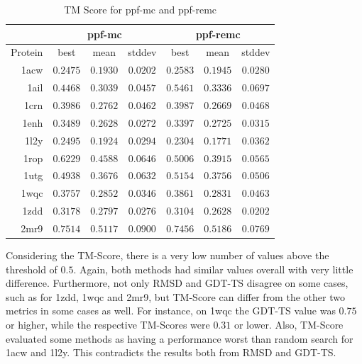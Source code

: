 \begin{table}
  \centering
  \begin{tabular}{r|c|c|c||c|c|c}
            & \multicolumn{3}{c}{ppf-mc} & \multicolumn{3}{||c}{ppf-remc} \\ \hline
    Protein & best          & mean          & stddev   & best          & mean          & stddev   \\ \hline \hline
    1acw    & $0.2475$      & $0.1930$      & $0.0202$ & $0.2583$      & $0.1945$      & $0.0280$ \\ \hline
    1ail    & $0.4468$      & $0.3039$      & $0.0457$ & $\bm{0.5461}$ & $0.3336$      & $0.0697$ \\ \hline
    1crn    & $0.3986$      & $0.2762$      & $0.0462$ & $0.3987$      & $0.2669$      & $0.0468$ \\ \hline
    1enh    & $0.3489$      & $0.2628$      & $0.0272$ & $0.3397$      & $0.2725$      & $0.0315$ \\ \hline
    1l2y    & $0.2495$      & $0.1924$      & $0.0294$ & $0.2304$      & $0.1771$      & $0.0362$ \\ \hline
    1rop    & $\bm{0.6229}$ & $0.4588$      & $0.0646$ & $\bm{0.5006}$ & $0.3915$      & $0.0565$ \\ \hline
    1utg    & $0.4938$      & $0.3676$      & $0.0632$ & $\bm{0.5154}$ & $0.3756$      & $0.0506$ \\ \hline
    1wqc    & $0.3757$      & $0.2852$      & $0.0346$ & $0.3861$      & $0.2831$      & $0.0463$ \\ \hline
    1zdd    & $0.3178$      & $0.2797$      & $0.0276$ & $0.3104$      & $0.2628$      & $0.0202$ \\ \hline
    2mr9    & $\bm{0.7514}$ & $\bm{0.5117}$ & $0.0900$ & $\bm{0.7456}$ & $\bm{0.5186}$ & $0.0769$ \\ \hline
  \end{tabular}
  \caption{TM Score for ppf-mc and ppf-remc}
  \label{tab:tmscore-data}
\end{table}

Considering the TM-Score, there is a very low number of values above the
threshold of $0.5$. Again, both methods had similar values overall with very
little difference. Furthermore, not only RMSD and GDT-TS disagree on some cases,
such as for 1zdd, 1wqc and 2mr9, but
TM-Score can differ from the other two metrics in some cases as well. For
instance, on 1wqc the GDT-TS value was $0.75$ or higher, while the respective
TM-Scores were $0.31$ or lower. Also, TM-Score evaluated some methods as having
a performance worst than random search for 1acw and 1l2y. This contradicts the results
both from RMSD and GDT-TS.

